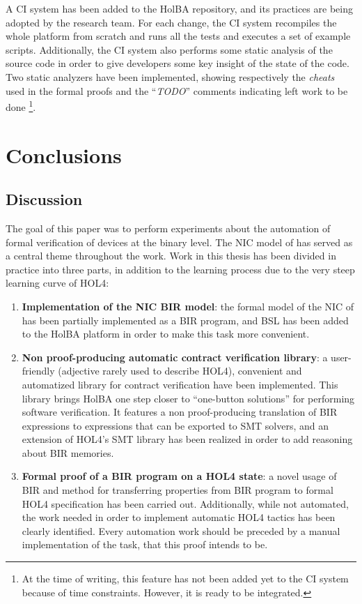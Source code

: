 \documentclass{kththesis}
\begin{document}
{A CI system has been added to the HolBA repository, and its practices are being adopted by the research team. For each change, the CI system recompiles the whole platform from scratch and runs all the tests and executes a set of example scripts. Additionally, the CI system also performs some static analysis of the source code in order to give developers some key insight of the state of the code. Two static analyzers have been implemented, showing respectively the \textit{cheats} used in the formal proofs and the ``\textit{TODO}'' comments indicating left work to be done \footnote{At the time of writing, this feature has not been added yet to the CI system because of time constraints. However, it is ready to be integrated.}.

\chapter{Conclusions}

\section{Discussion}

The goal of this paper was to perform experiments about the automation of formal verification of devices at the binary level. The NIC model of \cite{haglund_formal_2016} has served as a central theme throughout the work. Work in this thesis has been divided in practice into three parts, in addition to the learning process due to the very steep learning curve of HOL4:

\begin{enumerate}
    \item \textbf{Implementation of the NIC BIR model}: the formal model of the NIC of \cite{haglund_formal_2016} has been partially implemented as a BIR program, and BSL has been added to the HolBA platform in order to make this task more convenient.
    \item \textbf{Non proof-producing automatic contract verification library}: a user-friendly (adjective rarely used to describe HOL4), convenient and automatized library for contract verification have been implemented. This library brings HolBA one step closer to ``one-button solutions'' for performing software verification. It features a non proof-producing translation of BIR expressions to expressions that can be exported to SMT solvers, and an extension of HOL4's SMT library has been realized in order to add reasoning about BIR memories.
    \item \textbf{Formal proof of a BIR program on a HOL4 state}: a novel usage of BIR and method for transferring properties from BIR program to formal HOL4 specification has been carried out. Additionally, while not automated, the work needed in order to implement automatic HOL4 tactics has been clearly identified. Every automation work should be preceded by a manual implementation of the task, that this proof intends to be.
\end{enumerate}

}
\end{document}
